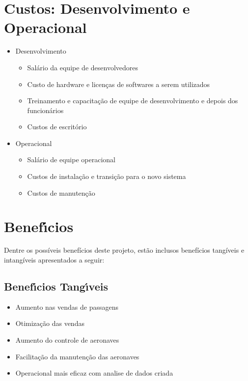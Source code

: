\section{Custos: Desenvolvimento e Operacional}
\begin{itemize}
       \item Desenvolvimento
             \begin{itemize}
                    \item Salário da equipe de desenvolvedores
                    \item Custo de hardware e licenças de softwares a serem utilizados
                    \item Treinamento e capacitação de equipe de desenvolvimento e depois dos funcionários
                    \item Custos de escritório
             \end{itemize}
       \item Operacional
             \begin{itemize}
                    \item Salário de equipe operacional
                    \item Custos de instalação e transição para o novo sistema
                    \item Custos de manutenção
                          
             \end{itemize}
\end{itemize}

\section{Benef\'{\i}cios}
Dentre os possíveis benefícios deste projeto, estão inclusos benefícios tangíveis e intangíveis
apresentados a seguir:

\subsection{Benef\'{\i}cios Tang\'{\i}veis}
\begin{itemize}
       \item Aumento nas vendas de passagens
       \item Otimização das vendas
       \item Aumento do controle de aeronaves 
       \item Facilitação da manutenção das aeronaves
       \item Operacional mais eficaz com analise de dados criada 
\end{itemize}



